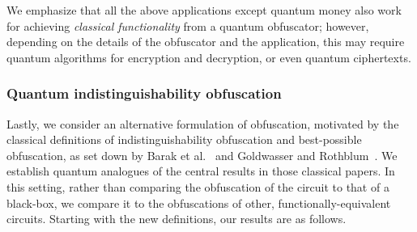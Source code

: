 \documentclass[11pt]{article}
\numberwithin{equation}{section}
\begin{document}
{We emphasize that all the above applications except quantum money also work for achieving \emph{classical functionality} from a quantum obfuscator; however, depending on the details of the obfuscator and the application, this may require quantum algorithms for encryption and decryption, or even quantum ciphertexts.


\subsubsection{Quantum indistinguishability obfuscation}

Lastly, we consider an alternative formulation of obfuscation, motivated by the classical definitions of indistinguishability obfuscation and best-possible obfuscation, as set down by Barak et al.~\cite{BGIRSVY12} and Goldwasser and Rothblum~\cite{GR07}. We establish quantum analogues of the central results in those classical papers. In this setting, rather than comparing the obfuscation of the circuit to that of a black-box, we compare it to the obfuscations of other, functionally-equivalent circuits. Starting with the new definitions, our results are as follows.

}
\end{document}
